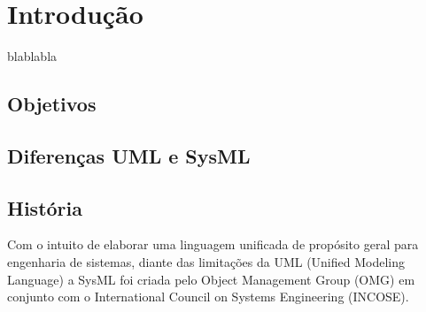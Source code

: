 \chapter{Introdução}\label{CAP:introducao}





blablabla

\section{Objetivos}


 
\section{Diferenças UML e SysML}






\section{História}

Com o intuito de elaborar uma linguagem unificada de propósito geral para engenharia de sistemas, diante das limitações da UML (Unified Modeling Language) a SysML foi criada pelo Object Management Group (OMG) em conjunto com o International Council on Systems Engineering (INCOSE). 


